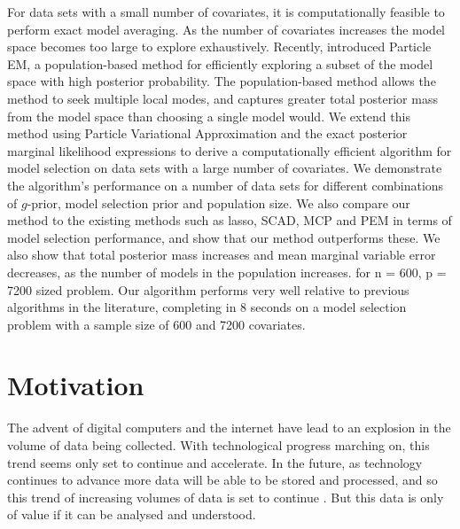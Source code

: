 For data sets with a small number of covariates, it is computationally feasible
to perform exact model averaging. As the number of covariates increases the
model space becomes too large to explore exhaustively.  Recently,
\cite{Rockova2017} introduced Particle EM, a population-based method for
efficiently exploring a subset of the model space with high posterior
probability. The population-based method allows the method to seek multiple
local modes, and captures greater total posterior mass from the model space
than choosing a single model would. We extend this method using Particle
Variational Approximation and the exact posterior marginal likelihood
expressions to derive a computationally efficient algorithm for model selection
on data sets with a large number of covariates. We demonstrate the algorithm's
performance on a number of data sets for different combinations of $g$-prior,
model selection prior and population size. We also compare our method to the
existing methods such as lasso, SCAD, MCP and PEM in terms of model selection
performance,  and show that our method outperforms these. We also show that
total posterior mass increases and mean marginal variable error decreases, as
the number of models in the population increases.
for n = 600, p = 7200 sized problem. Our algorithm performs very well relative
to previous algorithms in the literature, completing in 8 seconds on a model
selection problem with a sample size of 600 and 7200 covariates.

\section{Motivation}

The advent of digital computers and the internet have lead to an explosion in
the volume of data being collected. With technological progress marching on,
this trend seems only set to continue and accelerate. In the future, as
technology continues to advance more data will be able to be stored and
processed, and so this trend of increasing volumes of data is set to continue
\citep{Gandomi2015}. But this data is only of value if it can be analysed and
understood.

